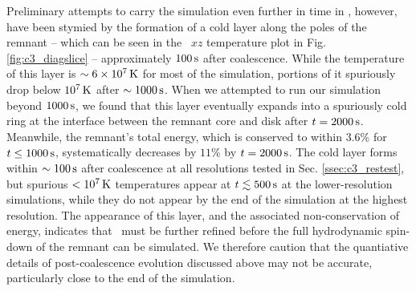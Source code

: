 
Preliminary attempts to carry the simulation even further in time in \arepo, however, have been stymied by the formation of a cold layer along the poles of the remnant -- which can be seen in the \arepo\ $xz$ temperature plot in Fig. \ref{fig:c3_diagslice} -- approximately $100\,\mathrm{s}$ after coalescence.  While the temperature of this layer is $\sim6\times10^7\,\mathrm{K}$ for most of the simulation, portions of it spuriously drop below $10^7\,\mathrm{K}$ after $\sim1000\,\mathrm{s}$.  When we attempted to run our simulation beyond $1000\,\mathrm{s}$, we found that this layer eventually expands into a spuriously cold ring at the interface between the remnant core and disk after $t = 2000\,\mathrm{s}$.  Meanwhile, the remnant's total energy, which is conserved to within $3.6$\% for $t \leq 1000\,\mathrm{s}$, systematically decreases by $11$\% by $t = 2000\,\mathrm{s}$.  The cold layer forms within $\sim100\,\mathrm{s}$ after coalescence at all resolutions tested in Sec. \ref{ssec:c3_restest}, but spurious $<10^7\,\mathrm{K}$ temperatures appear at $t \lesssim500\,\mathrm{s}$ at the lower-resolution simulations, while they do not appear by the end of the simulation at the highest resolution.  The appearance of this layer, and the associated non-conservation of energy, indicates that \arepo\ must be further refined before the full hydrodynamic spin-down of the remnant can be simulated.  We therefore caution that the quantiative details of post-coalescence evolution discussed above may not be accurate, particularly close to the end of the simulation.




